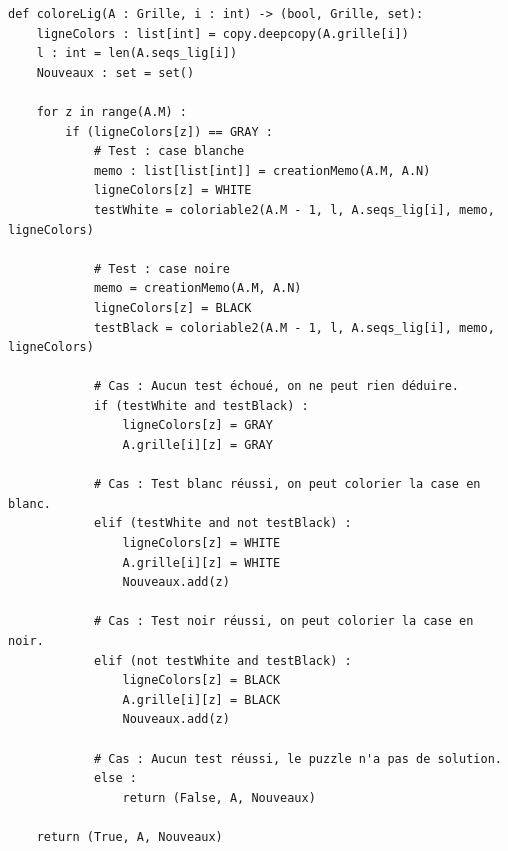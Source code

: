 \documentclass[a4paper,12pt]{article}
\begin{document}
\begin{lstlisting}
def coloreLig(A : Grille, i : int) -> (bool, Grille, set):
    ligneColors : list[int] = copy.deepcopy(A.grille[i])
    l : int = len(A.seqs_lig[i])
    Nouveaux : set = set()
    
    for z in range(A.M) :
        if (ligneColors[z]) == GRAY :
            # Test : case blanche
            memo : list[list[int]] = creationMemo(A.M, A.N)
            ligneColors[z] = WHITE
            testWhite = coloriable2(A.M - 1, l, A.seqs_lig[i], memo, ligneColors)
            
            # Test : case noire
            memo = creationMemo(A.M, A.N)
            ligneColors[z] = BLACK
            testBlack = coloriable2(A.M - 1, l, A.seqs_lig[i], memo, ligneColors)
            
            # Cas : Aucun test échoué, on ne peut rien déduire.
            if (testWhite and testBlack) :
                ligneColors[z] = GRAY
                A.grille[i][z] = GRAY
            
            # Cas : Test blanc réussi, on peut colorier la case en blanc.
            elif (testWhite and not testBlack) :
                ligneColors[z] = WHITE
                A.grille[i][z] = WHITE
                Nouveaux.add(z)
                
            # Cas : Test noir réussi, on peut colorier la case en noir.
            elif (not testWhite and testBlack) :
                ligneColors[z] = BLACK
                A.grille[i][z] = BLACK
                Nouveaux.add(z)
                
            # Cas : Aucun test réussi, le puzzle n'a pas de solution.
            else :
                return (False, A, Nouveaux)
    
    return (True, A, Nouveaux)
\end{lstlisting}

\newpage
\end{document}
